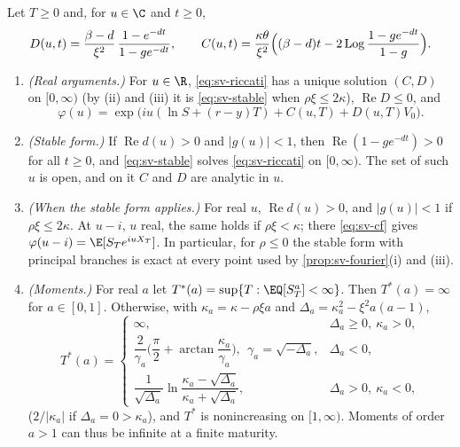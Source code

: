 \begin{theorem}\label{thm:sv-cf}
Let $T\ge0$ and, for $u\in\C$ and $t\ge0$,
\begin{equation}\label{eq:sv-stable}
  D(u,t)=\frac{\beta-d}{\xi^2}\,\frac{1-e^{-dt}}{1-ge^{-dt}},\qquad
  C(u,t)=\frac{\kappa\theta}{\xi^2}\Big((\beta-d)t-2\operatorname{Log}\frac{1-ge^{-dt}}{1-g}\Big).
\end{equation}
\begin{enumerate}[label=(\roman*)]
  \item \emph{(Real arguments.)} For $u\in\R$, \eqref{eq:sv-riccati} has a unique solution $(C,D)$ on $[0,\infty)$
    (by (ii) and (iii) it is \eqref{eq:sv-stable} when $\rho\xi\le2\kappa$), $\operatorname{Re}D\le0$, and
    \begin{equation}\label{eq:sv-cf}
      \varphi(u)=\exp\big(iu(\ln S+(r-y)T)+C(u,T)+D(u,T)V_0\big).
    \end{equation}
  \item \emph{(Stable form.)} If $\operatorname{Re}d(u)>0$ and $|g(u)|<1$, then
    $\operatorname{Re}(1-ge^{-dt})>0$ for all $t\ge0$, and \eqref{eq:sv-stable} solves \eqref{eq:sv-riccati} on
    $[0,\infty)$. The set of such $u$ is open, and on it $C$ and $D$ are analytic in $u$.
  \item \emph{(When the stable form applies.)} For real $u$, $\operatorname{Re}d(u)>0$, and $|g(u)|<1$ if
    $\rho\xi\le2\kappa$. At $u-i$, $u$ real, the same holds if $\rho\xi<\kappa$; there \eqref{eq:sv-cf} gives
    $\varphi(u-i)=\E[S_Te^{iuX_T}]$. In particular, for $\rho\le0$ the stable form with principal branches is
    exact at every point used by \cref{prop:sv-fourier}(i) and (iii).
  \item \emph{(Moments.)} For real $a$ let $T^*(a)=\sup\{T:\EQ[S_T^a]<\infty\}$. Then $T^*(a)=\infty$ for
    $a\in[0,1]$. Otherwise, with $\kappa_a=\kappa-\rho\xi a$ and $\Delta_a=\kappa_a^2-\xi^2a(a-1)$,
    \begin{equation}\label{eq:sv-explosion}
      T^*(a)=\begin{cases}
        \infty, & \Delta_a\ge0,\ \kappa_a>0,\\[0.3ex]
        \dfrac{2}{\gamma_a}\Big(\dfrac\pi2+\arctan\dfrac{\kappa_a}{\gamma_a}\Big),\ \ \gamma_a=\sqrt{-\Delta_a}, & \Delta_a<0,\\[1.2ex]
        \dfrac{1}{\sqrt{\Delta_a}}\ln\dfrac{\kappa_a-\sqrt{\Delta_a}}{\kappa_a+\sqrt{\Delta_a}}, & \Delta_a>0,\ \kappa_a<0,
      \end{cases}
    \end{equation}
    ($2/|\kappa_a|$ if $\Delta_a=0>\kappa_a$), and $T^*$ is nonincreasing on $[1,\infty)$. Moments of order
    $a>1$ can thus be infinite at a finite maturity.
\end{enumerate}
\end{theorem}

